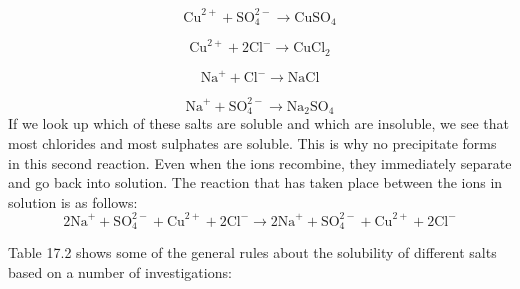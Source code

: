 \begin{enumerate}[noitemsep, label=\textbf{\arabic*}. ]
    \begin{equation}
    {\mathrm{Cu}}^{2+}+\mathrm{SO}_{4}^{2-}\to {\mathrm{CuSO}}_{4}\tag{17.19}
      \end{equation}
\label{m38719*id75876}\nopagebreak\noindent{}

    \begin{equation}
    {\mathrm{Cu}}^{2+}+2{\mathrm{Cl}}^{-}\to {\mathrm{CuCl}}_{2}\tag{17.20}
      \end{equation}
\label{m38719*id75745}\nopagebreak\noindent{}

    \begin{equation}
    {\mathrm{Na}}^{+}+{\mathrm{Cl}}^{-}\to \mathrm{NaCl}\tag{17.21}
      \end{equation}
\label{m38719*id75775}\nopagebreak\noindent{}

    \begin{equation}
    {\mathrm{Na}}^{+}+\mathrm{SO}_{4}^{2-}\to {\mathrm{Na}}_{2}{\mathrm{SO}}_{4}\tag{17.22}
      \end{equation}
If we look up which of these salts are soluble and which are insoluble, we see that most chlorides and most sulphates are soluble. This is why no precipitate forms in this second reaction. Even when the ions recombine, they immediately separate and go back into solution. The reaction that has taken place between the ions in solution is as follows:
\label{m38719*id74443}\nopagebreak\noindent{}
    \begin{equation}
    2{\mathrm{Na}}^{+}+\mathrm{SO}_{4}^{2-}+{\mathrm{Cu}}^{2+}+2{\mathrm{Cl}}^{-}\to 2{\mathrm{Na}}^{+}+\mathrm{SO}_{4}^{2-}+{\mathrm{Cu}}^{2+}+2{\mathrm{Cl}}^{-}\tag{17.23}
      \end{equation}
\end{enumerate}
      \label{m38719*id340954}Table 17.2 shows some of the general rules about the solubility of different salts based on a number of investigations:\par 
